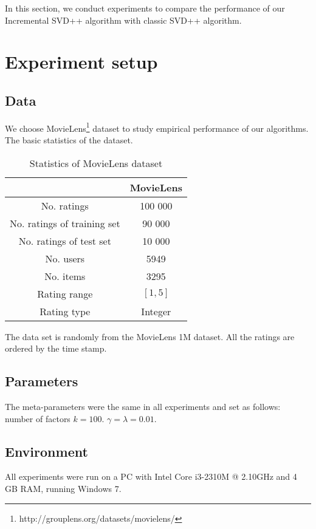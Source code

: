 \documentclass[oneside,13pt]{extreport}
\begin{document}
In this section, we conduct experiments to compare the performance
of our Incremental SVD++ algorithm with classic SVD++ algorithm.

\section{Experiment setup}
\subsection{Data}
We choose MovieLens\footnote{http://grouplens.org/datasets/movielens/} dataset to study empirical
performance of our algorithms. The basic statistics of the dataset.

\begin{table}[h!]
    \small\centering
    \begin{tabular}{|c|c|}
        \hline
         & MovieLens  \\
        \hline
        No. ratings & 100 000 \\
        \hline
         No. ratings of training set & 90 000 \\
        \hline
         No. ratings of test set & 10 000 \\
        \hline
        No. users &  5949  \\
        \hline
        No. items &  3295 \\
        \hline
        Rating range & $\left[1, 5\right]$ \\
        \hline
        Rating type &  Integer\\
        \hline
    \end{tabular}
    \label{tab:MovieLens_datatest}
    \caption{ Statistics of MovieLens dataset}
\end{table}

The data set is  randomly from the MovieLens 1M dataset. All the ratings are ordered by the time stamp.
\subsection{Parameters} 
The meta-parameters were the same in all experiments and set as follows: 
number of factors $k = 100$. $\gamma = \lambda = 0.01$.

\subsection{Environment} 
All experiments were run on a PC with Intel Core i3-2310M @ 2.10GHz and 4 GB
RAM, running Windows 7.
\end{document}
